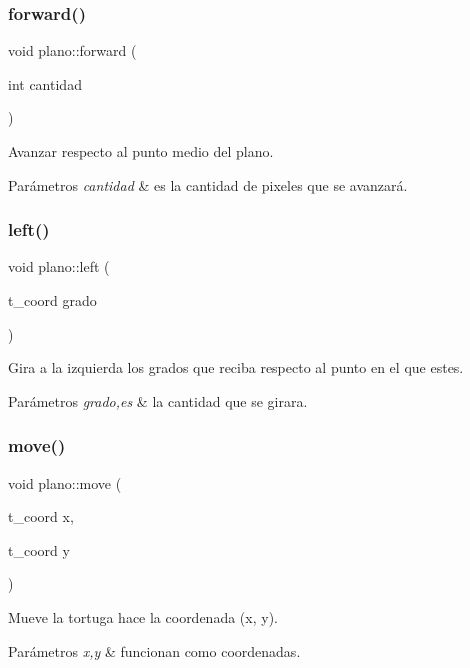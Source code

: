 \subsubsection{\texorpdfstring{forward()}{forward()}}
{\footnotesize\ttfamily void plano\+::forward (\begin{DoxyParamCaption}\item[{int}]{cantidad }\end{DoxyParamCaption})}

Avanzar respecto al punto medio del plano. 
\begin{DoxyParams}{Parámetros}
{\em cantidad} & es la cantidad de pixeles que se avanzará. \\
\hline
\end{DoxyParams}
\mbox{\label{classplano_ad5f11338792271b961051f7eff80c4cc}} 
\subsubsection{\texorpdfstring{left()}{left()}}
{\footnotesize\ttfamily void plano\+::left (\begin{DoxyParamCaption}\item[{t\+\_\+coord}]{grado }\end{DoxyParamCaption})}

Gira a la izquierda los grados que reciba respecto al punto en el que estes. 
\begin{DoxyParams}{Parámetros}
{\em grado,es} & la cantidad que se girara. \\
\hline
\end{DoxyParams}
\mbox{\label{classplano_a87e7fce6efc52d9b8c1e0c8946b1c2bb}} 
\subsubsection{\texorpdfstring{move()}{move()}}
{\footnotesize\ttfamily void plano\+::move (\begin{DoxyParamCaption}\item[{t\+\_\+coord}]{x,  }\item[{t\+\_\+coord}]{y }\end{DoxyParamCaption})}

Mueve la tortuga hace la coordenada (x, y). 
\begin{DoxyParams}{Parámetros}
{\em x,y} & funcionan como coordenadas. \\
\hline
\end{DoxyParams}
\mbox{\label{classplano_aa2ae0a48000f85adfc61663ae7011aa2}} 
